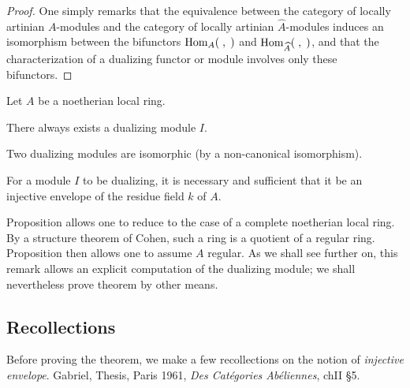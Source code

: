 \begin{proof}
One simply remarks that the equivalence between the category of locally artinian $A$-modules and the category of locally artinian $\hat{A}$-modules induces an isomorphism between the bifunctors $\operatorname{Hom}_{A}(\;, \;)$ and $\operatorname{Hom}_{\widehat{A}}(\;, \;)$, and that the characterization of a dualizing functor or module involves only these bifunctors.
\skipqed
\end{proof}

\begin{theorem} \label{IV.4.7}
Let $A$ be a noetherian local ring.
\begin{enumeratea}
\item
There always exists a dualizing module $I$.

\item
Two dualizing modules are isomorphic (by a non-canonical isomorphism).

\item
For a module $I$ to be dualizing, it is necessary and sufficient that it be an injective envelope of the residue field $k$ of $A$.
\end{enumeratea}
\end{theorem}

\begin{remark} \label{IV.4.8}
Proposition  allows one to reduce to the case of a complete noetherian local ring. By a structure theorem of Cohen, such a ring is a quotient of a regular ring. Proposition  then allows one to assume $A$ regular. As we shall see further on, this remark allows an explicit computation of the dualizing module; we shall nevertheless prove theorem  by other means.
\end{remark}

\subsection*{Recollections}
Before proving the theorem, we make a few recollections on the notion of \emph{injective envelope}. \Cf Gabriel, Thesis, Paris 1961, \emph{Des Cat\'egories Ab\'eliennes}, ch\ptbl II \S 5.

